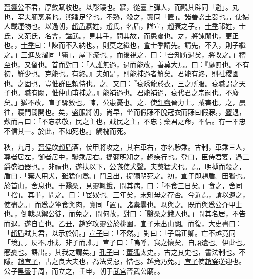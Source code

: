 \documentclass{article}
\newcommand{\tsu}{\small\kaishu\color{brown}}
\begin{document}
\uline{晉靈公}不君，厚斂{\tsu 賦收也。}以彫{\tsu 鏤也。}牆，從臺上彈人，而觀其辟{\tsu 同「避」。}丸也，\uline{宰夫}胹{\tsu 烹煮也。}熊蹯{\tsu 足掌也。}不熟，殺之，寘{\tsu 同「置」。}諸畚{\tsu 盛土器也。}，使婦人載{\tsu 運物也。}以過朝，\uline{趙盾}{\tsu 嬴姓，趙氏，名盾，諡宣，趙衰之子。}，\uline{士季}{\tsu 祁姓，士氏，又范氏，名會，諡武。}，見其手，問其故，而患{\tsu 憂也。}之，將諫{\tsu 閒也，更正也。}，\uline{士季}曰：「諫而不入{\tsu 納也。}，則莫之繼也，\uline{會}{\tsu 士季請先。}請先，不入，則子繼之。」三進及溜{\tsu 同「霤」，屋下流也。}，而後視之，曰：「吾知所過矣，將改之。」稽{\tsu 至也，又留也。}首而對曰：「人誰無過，過而能改，善莫大焉。曰：『靡{\tsu 無也。}不有初，鮮{\tsu 少也。}克{\tsu 能也。}有終。』夫如是，則能補過者鮮矣。君能有終，則社稷{\tsu 國也。}之固也，豈惟群臣賴{\tsu 恃也。}之。又曰：『袞{\tsu 綉龍於衣，王之所服。袞職謂之天子也。}職有闕，惟\uline{仲山甫}補之。』能補過也。君能補過，袞{\tsu 代君之宗嗣也。}不廢矣。」猶不改，宣子驟{\tsu 數也。}諫，公患{\tsu 憂也。}之，使\uline{鉏麑}{\tsu 晉力士。}賊{\tsu 害也。}之，晨往，寢門闢{\tsu 開也。}矣，盛服將朝，尚早，坐而假寐{\tsu 不脫冠衣而寐曰假寐。}，\uline{麑}退，歎而言曰：「不忘恭敬，民之主也，賊民之主，不忠；棄君之命，不信。有一{\tsu 不忠不信其一。}於此，不如死也。」觸槐而死。

秋，九月，\uline{晉侯}飲\uline{趙盾}酒，伏甲將攻之，其右{\tsu 車右，亦名驂乘。古制，車乘三人，尊者居左，御者居中，驂乘居右。}\uline{提彌明}知之，趨{\tsu 疾行也。}登曰，臣侍君宴，過三爵{\tsu 盛酒器也。}，非禮也，遂扶以下，\uline{公}嗾{\tsu 使犬聲。}夫獒{\tsu 猛犬也。}焉，\uline{明}搏而殺之，盾曰：「棄人用犬，雖猛何爲。」鬥且出，\uline{提彌明}死之。初，\uline{宣子}{\tsu 即趙盾。}田{\tsu 獵也。}於\uline{首山}，舍{\tsu 息也。}于\uline{翳桑}，見\uline{靈輒}餓，問其病，曰：「不食三日矣。」食之，舍{\tsu 同「捨」。}其半，問之。曰：「宦{\tsu 奴也。}三年矣，未知母之存否。今近焉，請以遺之，使盡之。」而爲之簞食與肉，寘{\tsu 同「置」。}諸橐{\tsu 囊也。}以與之。既而與爲\uline{公}介{\tsu 甲士也。}，倒戟以禦\uline{公}徒，而免之，問何故，對曰：「\uline{翳桑}之餓人也。」問其名居，不告而退，遂自亡也。乙丑，\uline{趙穿}攻\uline{靈公}於\uline{桃園}，\uline{宣子}未出山{\tsu 闕。}而復，\uline{大史}書曰：「\uline{趙盾}弒其君，以示於朝。」\uline{宣子}曰：「不然。」對曰：「子爲正卿。亡不越竟{\tsu 同「境」。}，反不討賊。非子而誰。」宣子曰：「嗚呼，我之懷矣，自詒{\tsu 遺也。}伊{\tsu 此也。}慼{\tsu 憂也。}{\tsu 語出。}，其我之謂矣。」\uline{孔子}曰：\uline{董狐}{\tsu 太史。}，古之良史也，書法{\tsu 制也。}不隱。\uline{趙宣子}，古之良大夫也，為法受惡，惜也。越竟乃免。」\uline{宣子}使\uline{趙穿}逆{\tsu 迎也。}公子\uline{黑臀}于周，而立之，壬申，朝于\uline{武宮}{\tsu 晉武公廟。}。
\end{document}
